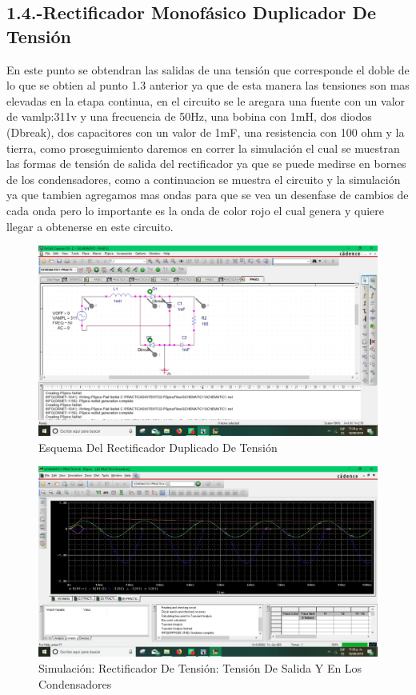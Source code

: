 \documentclass[10pt,a4paper]{article}
\begin{document}
\newpage
\subsection{1.4.-Rectificador Monofásico Duplicador De Tensión}
En este punto se obtendran las salidas de una tensión que corresponde el doble de lo que se obtien al punto 1.3 anterior  ya que de esta manera las tensiones son mas elevadas en la etapa continua, en el circuito se le aregara una fuente con un valor de  vamlp:311v y una frecuencia de 50Hz, una bobina con 1mH, dos diodos (Dbreak), dos capacitores con un valor de 1mF, una resistencia con 100 ohm y la tierra, como proseguimiento daremos en correr la simulación el cual se muestran las formas de tensión de salida del rectificador ya que se puede medirse en bornes de los condensadores, como a continuacion se muestra el circuito y la simulación ya que tambien agregamos mas ondas para que se vea un desenfase de cambios de cada onda pero lo importante es la onda de color rojo el cual genera y quiere llegar a obtenerse en este circuito.
\begin{figure}[hbtp]
\centering
\includegraphics[scale=0.3]{04.jpeg}
\caption{Esquema Del Rectificador Duplicado De Tensión}
\end{figure}
\begin{figure}[hbtp]
\centering
\includegraphics[scale=0.3]{4.jpeg}
\caption{Simulación: Rectificador De Tensión: Tensión De Salida Y En Los Condensadores}
\end{figure}
\end{document}
